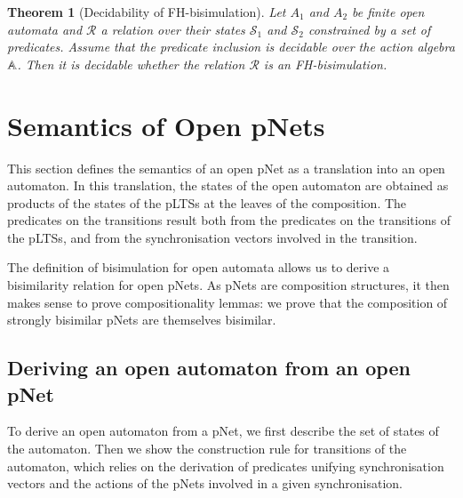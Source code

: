\documentclass{elsarticle}
\newtheorem{thm}{Theorem}
\begin{document}
\begin{thm}[Decidability of FH-bisimulation]
Let $A_1$ and $A_2$ be finite open automata
and $\mathcal{R}$ a relation over their states $\mathcal{S}_1$ and
$\mathcal{S}_2$ constrained by a set of predicates. Assume that
the predicate inclusion is decidable over  
the action algebra $\mathbb{A}$. Then it is decidable whether the relation 
$\mathcal{R}$ is an FH-bisimulation.
  
\end{thm}



\section{Semantics of Open pNets}
\label{section:op-semantics}

This section defines the semantics of an open pNet as a translation into an open automaton. 
In this translation, the states of the open automaton are obtained as products of 
the states of the pLTSs at the leaves of the composition. The
predicates on the transitions result both from the predicates on
the transitions of the pLTSs, and from the synchronisation vectors involved in
the transition. 

The definition of bisimulation for open automata allows us to derive  a
bisimilarity relation for open pNets. As pNets are composition
structures, it then makes sense to prove compositionality lemmas: we prove
that the composition of strongly bisimilar pNets are themselves
bisimilar. 

\subsection{Deriving an open automaton from an open pNet}
To derive an open automaton from a pNet, we first describe the set of states of the automaton. Then we show the construction rule for transitions of the automaton, which  relies on the derivation of predicates unifying synchronisation vectors and the actions of the pNets involved in a given synchronisation.

\end{document}
